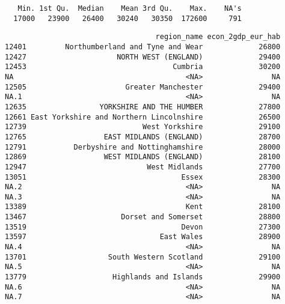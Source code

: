 \documentclass[]{article}
\newenvironment{Shaded}{\begin{snugshade}}{\end{snugshade}}
\newcommand{\DecValTok}[1]{\textcolor[rgb]{0.00,0.00,0.81}{#1}}
\newcommand{\KeywordTok}[1]{\textcolor[rgb]{0.13,0.29,0.53}{\textbf{#1}}}
\newcommand{\NormalTok}[1]{#1}
\newcommand{\OperatorTok}[1]{\textcolor[rgb]{0.81,0.36,0.00}{\textbf{#1}}}
\newcommand{\StringTok}[1]{\textcolor[rgb]{0.31,0.60,0.02}{#1}}
\begin{document}
\begin{verbatim}
   Min. 1st Qu.  Median    Mean 3rd Qu.    Max.    NA's 
  17000   23900   26400   30240   30350  172600     791 
\end{verbatim}

\begin{Shaded}
\end{Shaded}

\begin{verbatim}
                                   region_name econ_2gdp_eur_hab
12401         Northumberland and Tyne and Wear             26800
12427                     NORTH WEST (ENGLAND)             29400
12453                                  Cumbria             30200
NA                                        <NA>                NA
12505                       Greater Manchester             29400
NA.1                                      <NA>                NA
12635                 YORKSHIRE AND THE HUMBER             27800
12661 East Yorkshire and Northern Lincolnshire             26500
12739                           West Yorkshire             29100
12765                  EAST MIDLANDS (ENGLAND)             28700
12791           Derbyshire and Nottinghamshire             28000
12869                  WEST MIDLANDS (ENGLAND)             28100
12947                            West Midlands             27700
13051                                    Essex             28300
NA.2                                      <NA>                NA
NA.3                                      <NA>                NA
13389                                     Kent             28100
13467                      Dorset and Somerset             28800
13519                                    Devon             27300
13597                               East Wales             28900
NA.4                                      <NA>                NA
13701                   South Western Scotland             29100
NA.5                                      <NA>                NA
13779                    Highlands and Islands             29900
NA.6                                      <NA>                NA
NA.7                                      <NA>                NA
\end{verbatim}
\end{document}
